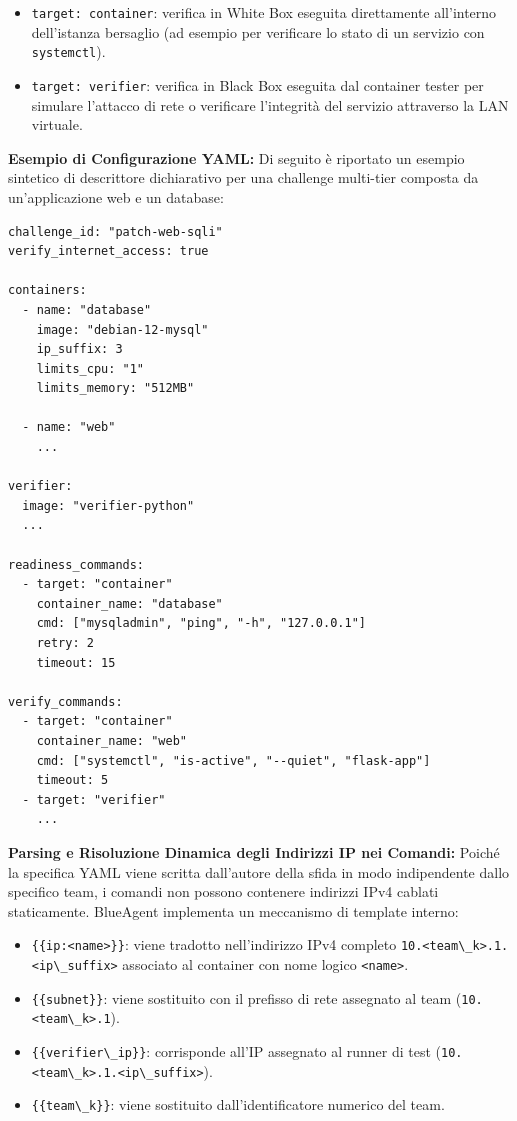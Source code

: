 \begin{enumerate}
  \begin{itemize}
  \tightlist
  \item
    \passthrough{\lstinline!target: container!}: verifica in White Box
    eseguita direttamente all'interno dell'istanza bersaglio (ad esempio
    per verificare lo stato di un servizio con
    \passthrough{\lstinline!systemctl!}).
  \item
    \passthrough{\lstinline!target: verifier!}: verifica in Black Box
    eseguita dal container tester per simulare l'attacco di rete o
    verificare l'integrità del servizio attraverso la LAN virtuale.
  \end{itemize}
\end{enumerate}

\textbf{Esempio di Configurazione YAML:} Di seguito è riportato un
esempio sintetico di descrittore dichiarativo per una challenge
multi-tier composta da un'applicazione web e un database:

\begin{lstlisting}
challenge_id: "patch-web-sqli"
verify_internet_access: true

containers:
  - name: "database"
    image: "debian-12-mysql"
    ip_suffix: 3
    limits_cpu: "1"
    limits_memory: "512MB"

  - name: "web"
    ...

verifier:
  image: "verifier-python"
  ...

readiness_commands:
  - target: "container"
    container_name: "database"
    cmd: ["mysqladmin", "ping", "-h", "127.0.0.1"]
    retry: 2
    timeout: 15

verify_commands:
  - target: "container"
    container_name: "web"
    cmd: ["systemctl", "is-active", "--quiet", "flask-app"]
    timeout: 5
  - target: "verifier"
    ...
\end{lstlisting}

\textbf{Parsing e Risoluzione Dinamica degli Indirizzi IP nei Comandi:}
Poiché la specifica YAML viene scritta dall'autore della sfida in modo
indipendente dallo specifico team, i comandi non possono contenere
indirizzi IPv4 cablati staticamente. BlueAgent implementa un meccanismo
di template interno:

\begin{itemize}
\tightlist
\item
  \passthrough{\lstinline!\{\{ip:<name>\}\}!}: viene tradotto
  nell'indirizzo IPv4 completo
  \passthrough{\lstinline!10.<team\_k>.1.<ip\_suffix>!} associato al
  container con nome logico \passthrough{\lstinline!<name>!}.
\item
  \passthrough{\lstinline!\{\{subnet\}\}!}: viene sostituito con il
  prefisso di rete assegnato al team
  (\passthrough{\lstinline!10.<team\_k>.1!}).
\item
  \passthrough{\lstinline!\{\{verifier\_ip\}\}!}: corrisponde all'IP
  assegnato al runner di test
  (\passthrough{\lstinline!10.<team\_k>.1.<ip\_suffix>!}).
\item
  \passthrough{\lstinline!\{\{team\_k\}\}!}: viene sostituito
  dall'identificatore numerico del team.
\end{itemize}


